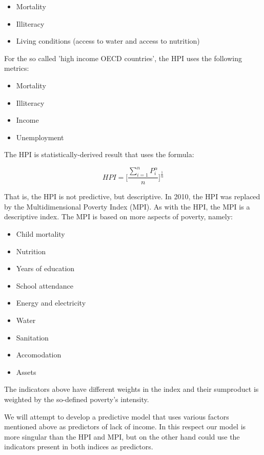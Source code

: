 \documentclass{article}
\begin{document}
\begin{itemize}
  \item Mortality
  \item Illiteracy
  \item Living conditions (access to water and access to nutrition)
\end{itemize}

For the so called 'high income OECD countries', the HPI uses the following metrics:

\begin{itemize}
  \item Mortality
  \item Illiteracy
  \item Income
  \item Unemployment
\end{itemize}

The HPI is statistically-derived result that uses the formula:

\begin{equation}
  HPI = \Bigg[ \frac{\sum_{i = 1}^{n} P_i^\alpha}{n} \Bigg]^{\frac{1}{\alpha}}
\end{equation}

That is, the HPI is not predictive, but descriptive. In 2010, the HPI was replaced by the Multidimensional Poverty Index (MPI). As with the HPI, the MPI is a descriptive index. The MPI is based on more aspects of poverty, namely:

\begin{itemize}
  \item Child mortality
  \item Nutrition
  \item Years of education
  \item School attendance
  \item Energy and electricity
  \item Water
  \item Sanitation
  \item Accomodation
  \item Assets
\end{itemize}

The indicators above have different weights in the index and their sumproduct is weighted by the so-defined poverty's intensity.

We will attempt to develop a predictive model that uses various factors mentioned above as predictors of lack of income. In this respect our model is more singular than the HPI and MPI, but on the other hand could use the indicators present in both indices as predictors.
\end{document}
